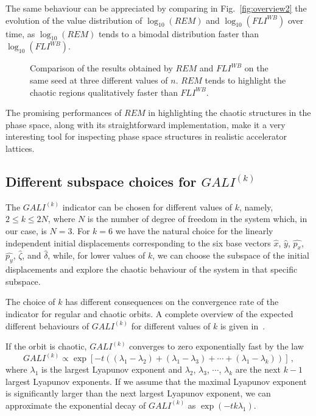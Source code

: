 The same behaviour can be appreciated by comparing in Fig.~\ref{fig:overview2} the evolution of the value distribution of $\log_{10}(REM)$ and $\log_{10}(FLI^{WB})$ over time, as $\log_{10}(REM)$ tends to a bimodal distribution faster than $\log_{10}(FLI^{WB})$.

\begin{figure}
    \centering
    \caption{Comparison of the results obtained by $REM$ and $FLI^{WB}$ on the same seed at three different values of $n$. $REM$ tends to highlight the chaotic regions qualitatively faster than $FLI^{WB}$.}
    \label{fig:rem_lhc}
\end{figure}

The promising performances of $REM$ in highlighting the chaotic structures in the phase space, along with its straightforward implementation, make it a very interesting tool for inspecting phase space structures in realistic accelerator lattices.

\subsection{Different subspace choices for $GALI^{(k)}$}

The $GALI^{(k)}$ indicator can be chosen for different values of $k$, namely, $2 \leq k \leq 2N$, where $N$ is the number of degree of freedom in the system which, in our case, is $N=3$. For $k=6$ we have the natural choice for the linearly independent initial displacements corresponding to the six base vectors $\hat{x}$, $\hat{y}$, $\hat{p_x}$, $\hat{p_y}$, $\hat{\zeta}$, and $\hat{\delta}$, while, for lower values of $k$, we can choose the subspace of the initial displacements and explore the chaotic behaviour of the system in that specific subspace.

The choice of $k$ has different consequences on the convergence rate of the indicator for regular and chaotic orbits. A complete overview of the expected different behaviours of $GALI^{(k)}$ for different values of $k$ is given in~\cite{SKOKOS200730}.

If the orbit is chaotic, $GALI^{(k)}$ converges to zero exponentially fast by the law
\begin{equation}
    GALI^{(k)} \propto \exp\left[-t\left((\lambda_1 - \lambda_2)+(\lambda_1 - \lambda_3)+\cdots+(\lambda_1 - \lambda_k)\right)\right] \,,
\end{equation}
where $\lambda_1$ is the largest Lyapunov exponent and $\lambda_2$, $\lambda_3$, $\cdots$, $\lambda_k$ are the next $k-1$ largest Lyapunov exponents. If we assume that the maximal Lyapunov exponent is significantly larger than the next largest Lyapunov exponent, we can approximate the exponential decay of $GALI^{(k)}$ as $\exp(-tk\lambda_1)$.

